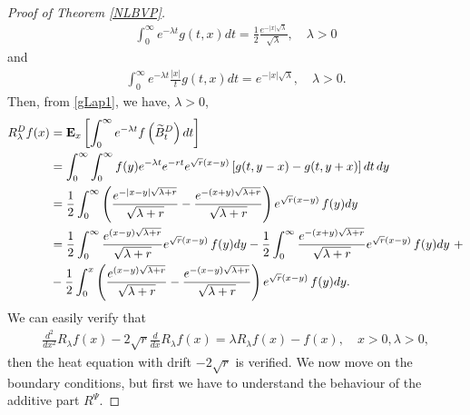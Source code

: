 \documentclass[11pt,a4paper]{article}
\theoremstyle{definition}
\theoremstyle{remark}
\begin{document}
\begin{proof}[Proof of Theorem \ref{NLBVP}]
\begin{align}
		\int_0^\infty e^{-\lambda t} g(t,x) dt = \frac{1}{2}\frac{e^{-\vert x \vert \sqrt \lambda}}{\sqrt \lambda}, \quad \lambda >0
	\end{align}
	and
	\begin{align}
		\label{gLap2}
		\int_0^\infty e^{-\lambda t} \frac{\vert x \vert }{t} g(t,x) dt = e^{- \vert x \vert \sqrt \lambda}, \quad \lambda>0.
	\end{align}
	Then, from \eqref{gLap1}, we have, $\lambda>0$,
	\begin{align*}
		R_\lambda^D f(x) &= \mathbf{E}_x\left[ \int_0^\infty e^{-\lambda t} f \left(\widetilde{B}^D_t \right) dt \right] \\
		&=\int_0^\infty \int_0^\infty f(y) e^{-\lambda t} e^{- rt} e^{\sqrt{r}(x-y)} \left[g(t,y-x) - g(t,y+x)\right] dt \, dy\\
		&=\frac{1}{2}\int_0^\infty \left(\frac{e^{-\vert x-y \vert \sqrt{\lambda+ r}}}{\sqrt{\lambda+ r}}- \frac{e^{-( x+y)  \sqrt{\lambda+ r}}}{\sqrt{\lambda+ r}} \right) e^{\sqrt{r}(x-y)}\, f(y) dy\\
		&=\frac{1}{2} \int_0^\infty \frac{e^{( x-y)  \sqrt{\lambda+ r}}}{\sqrt{\lambda+ r}} e^{\sqrt{r}(x-y)}\, f(y) dy - \frac{1}{2} \int_0^\infty \frac{e^{-( x+y)  \sqrt{\lambda+ r}}}{\sqrt{\lambda+ r}} e^{\sqrt{r}(x-y)} \, f(y) dy\ +\notag\\
		& - \frac{1}{2} \int_0^x \left( \frac{e^{( x-y)  \sqrt{\lambda+ r}}}{\sqrt{\lambda+ r}} - \frac{e^{-( x-y)  \sqrt{\lambda+ r}}}{\sqrt{\lambda+ r}} \right) e^{\sqrt{r}(x-y)}\, f(y) dy.
	\end{align*}
	We can easily verify that 
	\begin{align*}
		\frac{d^2}{dx^2}R_\lambda f(x) - 2\sqrt{r} \frac{d}{dx} R_\lambda f(x) = \lambda R_\lambda f(x) - f(x), \quad x>0, \lambda > 0,
	\end{align*}
	then the heat equation with drift \(-2 \sqrt{r}\) is verified. We now move on the boundary conditions, but first we have to understand the behaviour of the additive part \(R^\Psi\).
	

\end{proof}
\end{document}
